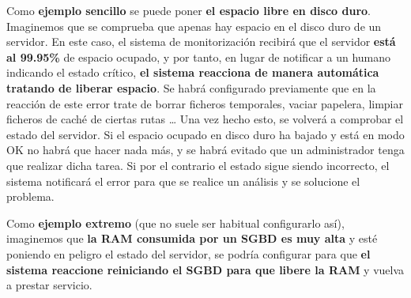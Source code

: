 Como \textbf{ejemplo sencillo} se puede poner \textbf{el espacio libre en disco duro}. Imaginemos que se comprueba que apenas hay espacio en el disco duro de un servidor. En este caso, el sistema de monitorización recibirá que el servidor \textbf{está al 99.95\%} de espacio ocupado, y por tanto, en lugar de notificar a un humano indicando el estado crítico, \textbf{el sistema reacciona de manera automática tratando de liberar espacio}. Se habrá configurado previamente que en la reacción de este error trate de borrar ficheros temporales, vaciar papelera, limpiar ficheros de caché de ciertas rutas … Una vez hecho esto, se volverá a comprobar el estado del servidor. Si el espacio ocupado en disco duro ha bajado y está en modo OK no habrá que hacer nada más, y se habrá evitado que un administrador tenga que realizar dicha tarea. Si por el contrario el estado sigue siendo incorrecto, el sistema notificará el error para que se realice un análisis y se solucione el problema.

Como \textbf{ejemplo extremo} (que no suele ser habitual configurarlo así), imaginemos que \textbf{la RAM consumida por un SGBD es muy alta} y esté poniendo en peligro el estado del servidor, se podría configurar para que \textbf{el sistema reaccione reiniciando el SGBD para que libere la RAM} y vuelva a prestar servicio.


